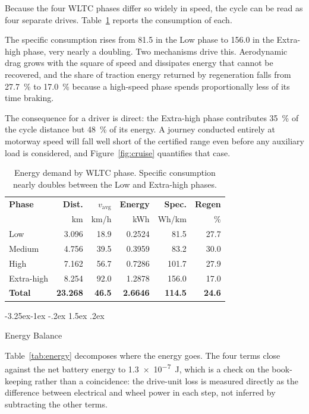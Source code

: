 \documentclass[twocolumn]{article}
\makeatletter
\renewcommand\subsection{\@startsection{subsection}{2}{\z@}%
  {-3.25ex\@plus -1ex \@minus -.2ex}%
  {1.5ex \@plus .2ex}%
  {\raggedright\normalfont\large\bfseries}}
\makeatother
\begin{document}
Because the four WLTC phases differ so widely in speed, the cycle can be read
as four separate drives. Table~\ref{tab:phases} reports the consumption of
each.

The specific consumption rises from \SI{81.5}{\Whpkm} in the
Low phase to \SI{156.0}{\Whpkm} in the Extra-high phase,
very nearly a doubling. Two mechanisms drive this. Aerodynamic drag grows with
the square of speed and dissipates energy that cannot be recovered, and the
share of traction energy returned by regeneration falls from
\SI{27.7}{\percent} to \SI{17.0}{\percent} because a high-speed phase spends
proportionally less of its time braking.

The consequence for a driver is direct: the Extra-high phase contributes
\SI{35}{\percent} of the cycle distance but \SI{48}{\percent} of its energy.
A journey conducted entirely at motorway speed will fall well short of the
certified range even before any auxiliary load is considered, and
Figure~\ref{fig:cruise} quantifies that case.

\begin{table}[H]
\centering
\caption{Energy demand by WLTC phase. Specific consumption nearly doubles
between the Low and Extra-high phases.}
\label{tab:phases}
\footnotesize
\begin{tabular}{@{}lrrrrr@{}}
\toprule
\textbf{Phase} & \textbf{Dist.} & \textbf{$v_{\mathrm{avg}}$} & \textbf{Energy}
 & \textbf{Spec.} & \textbf{Regen} \\
 & km & km/h & kWh & Wh/km & \% \\
\midrule
Low        & 3.096 & 18.9 & 0.2524 &  81.5 & 27.7 \\
Medium     & 4.756 & 39.5 & 0.3959 &  83.2 & 30.0 \\
High       & 7.162 & 56.7 & 0.7286 & 101.7 & 27.9 \\
Extra-high & 8.254 & 92.0 & 1.2878 & 156.0 & 17.0 \\
\midrule
\textbf{Total} & \textbf{23.268} & \textbf{46.5} & \textbf{2.6646}
 & \textbf{114.5} & \textbf{24.6} \\
\bottomrule
\end{tabular}
\end{table}

\subsection{Energy Balance}

Table~\ref{tab:energy} decomposes where the energy goes. The four terms close
against the net battery energy to \SI{1.3e-7}{\joule}, which is a check on the
book-keeping rather than a coincidence: the drive-unit loss is
measured directly as the difference between electrical and wheel power in each
step, not inferred by subtracting the other terms.
\end{document}
